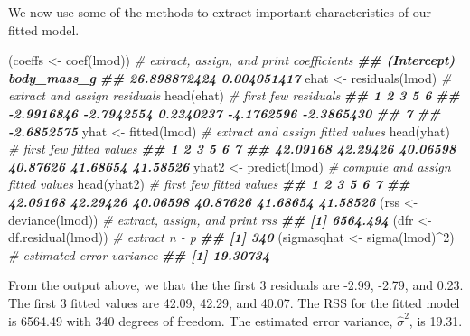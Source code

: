 \documentclass[
]{book}
\newenvironment{Shaded}{\begin{snugshade}}{\end{snugshade}}
\newcommand{\CommentTok}[1]{\textcolor[rgb]{0.56,0.35,0.01}{\textit{#1}}}
\newcommand{\DecValTok}[1]{\textcolor[rgb]{0.00,0.00,0.81}{#1}}
\newcommand{\DocumentationTok}[1]{\textcolor[rgb]{0.56,0.35,0.01}{\textbf{\textit{#1}}}}
\newcommand{\FunctionTok}[1]{\textcolor[rgb]{0.00,0.00,0.00}{#1}}
\newcommand{\NormalTok}[1]{#1}
\newcommand{\OtherTok}[1]{\textcolor[rgb]{0.56,0.35,0.01}{#1}}
\newcommand{\SpecialCharTok}[1]{\textcolor[rgb]{0.00,0.00,0.00}{#1}}
\theoremstyle{definition}
\theoremstyle{definition}
\theoremstyle{definition}
\theoremstyle{definition}
\theoremstyle{remark}
\begin{document}
We now use some of the methods to extract important characteristics of our fitted model.

\begin{Shaded}
\begin{Highlighting}[]
\NormalTok{(coeffs }\OtherTok{\textless{}{-}} \FunctionTok{coef}\NormalTok{(lmod)) }\CommentTok{\# extract, assign, and print coefficients}
\DocumentationTok{\#\#  (Intercept)  body\_mass\_g }
\DocumentationTok{\#\# 26.898872424  0.004051417}
\NormalTok{ehat }\OtherTok{\textless{}{-}} \FunctionTok{residuals}\NormalTok{(lmod) }\CommentTok{\# extract and assign residuals}
\FunctionTok{head}\NormalTok{(ehat) }\CommentTok{\# first few residuals}
\DocumentationTok{\#\#          1          2          3          5          6 }
\DocumentationTok{\#\# {-}2.9916846 {-}2.7942554  0.2340237 {-}4.1762596 {-}2.3865430 }
\DocumentationTok{\#\#          7 }
\DocumentationTok{\#\# {-}2.6852575}
\NormalTok{yhat }\OtherTok{\textless{}{-}} \FunctionTok{fitted}\NormalTok{(lmod) }\CommentTok{\# extract and assign fitted values}
\FunctionTok{head}\NormalTok{(yhat) }\CommentTok{\# first few fitted values}
\DocumentationTok{\#\#        1        2        3        5        6        7 }
\DocumentationTok{\#\# 42.09168 42.29426 40.06598 40.87626 41.68654 41.58526}
\NormalTok{yhat2 }\OtherTok{\textless{}{-}} \FunctionTok{predict}\NormalTok{(lmod) }\CommentTok{\# compute and assign fitted values}
\FunctionTok{head}\NormalTok{(yhat2) }\CommentTok{\# first few fitted values}
\DocumentationTok{\#\#        1        2        3        5        6        7 }
\DocumentationTok{\#\# 42.09168 42.29426 40.06598 40.87626 41.68654 41.58526}
\NormalTok{(rss }\OtherTok{\textless{}{-}} \FunctionTok{deviance}\NormalTok{(lmod)) }\CommentTok{\# extract, assign, and print rss}
\DocumentationTok{\#\# [1] 6564.494}
\NormalTok{(dfr }\OtherTok{\textless{}{-}} \FunctionTok{df.residual}\NormalTok{(lmod)) }\CommentTok{\# extract n {-} p}
\DocumentationTok{\#\# [1] 340}
\NormalTok{(sigmasqhat }\OtherTok{\textless{}{-}} \FunctionTok{sigma}\NormalTok{(lmod)}\SpecialCharTok{\^{}}\DecValTok{2}\NormalTok{) }\CommentTok{\# estimated error variance}
\DocumentationTok{\#\# [1] 19.30734}
\end{Highlighting}
\end{Shaded}

From the output above, we that the the first 3 residuals are -2.99, -2.79, and 0.23. The first 3 fitted values are 42.09, 42.29, and 40.07. The RSS for the fitted model is 6564.49 with 340 degrees of freedom. The estimated error variance, \(\hat{\sigma}^2\), is 19.31.
\end{document}
